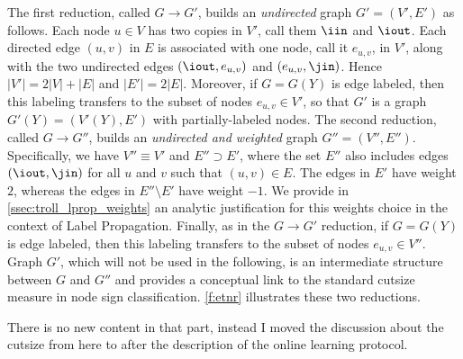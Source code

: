 The first reduction, called $G \rightarrow G'$, builds an \emph{undirected} graph $G' = (V',E')$ as
follows. Each node $u \in V$ has two copies in $V'$, call them $\iin$ and $\iout$. Each directed
edge $(u,v)$ in $E$ is associated with one node, call it $e_{u,v}$, in $V'$, along with the two
undirected edges $(\iout,e_{u,v})$ and $(e_{u,v},\jin)$. Hence $|V'| = 2|V|+|E|$ and $|E'| = 2|E|$.
Moreover, if $G = G(Y)$ is edge labeled, then this labeling transfers to the subset of nodes
$e_{u,v} \in V'$, so that $G'$ is a graph $G'(Y) = (V'(Y),E')$ with partially-labeled nodes. The
second reduction, called $G \rightarrow G''$, builds an \emph{undirected and weighted} graph $G'' =
(V'',E'')$. Specifically, we have $V'' \equiv V'$ and $E'' \supset E'$, where the set $E''$ also
includes edges $(\iout,\jin)$ for all $u$ and $v$ such that $(u,v) \in E$. The edges in $E'$ have
weight $2$, whereas the edges in $E''\setminus E'$ have weight $-1$. We provide in
\autoref{ssec:troll_lprop_weights} an analytic justification for this weights choice in the context
of Label Propagation. Finally, as in the $G \rightarrow G'$ reduction, if $G = G(Y)$ is edge
labeled, then this labeling transfers to the subset of nodes $e_{u,v} \in V''$. Graph $G'$, which
will not be used in the following, is an intermediate structure between $G$ and $G''$ and provides a
conceptual link to the standard cutsize measure in node sign classification. \autoref{f:etnr}
illustrates these two reductions. 

\begin{newcontent}
  There is no new content in that part, instead I moved the discussion about the cutsize from here
  to after the description of the online learning protocol.
\end{newcontent}

